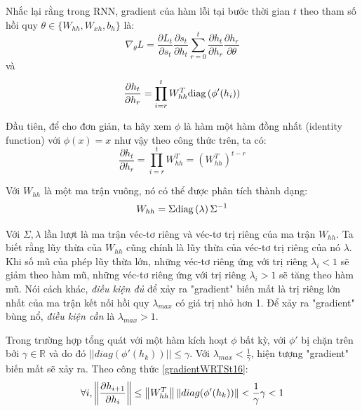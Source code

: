 Nhắc lại rằng trong RNN, gradient của hàm lỗi tại bước thời gian $t$ theo tham số hồi quy $\theta  \in \{W_{hh}, W_{xh}, b_h \}$ là:
\begin{equation} \label{beginGradientVanish0}
\nabla_{\theta}L = \frac{\partial L_t}{\partial s_t} \frac{\partial s_t}{\partial h_t} \sum_{r=0}^{t}  \frac{\partial h_t}{\partial h_r}\frac{\partial h_r}{\partial \theta}
\end{equation}
và 
\begin{equation} \label{beginGradientVanish1}
\frac{\partial h_t}{\partial h_r} = \prod_{i=r}^{t} W_{hh}^T \mathrm{diag} \left( \phi'(h_i) \right)
\end{equation}

Đầu tiên, để cho đơn giản, ta hãy xem $\phi$ là hàm một hàm đồng nhất (identity function) với $\phi(x) = x$ như vậy theo công thức trên, ta có:
\begin{equation} \label{gradientVanish3}
\frac{\partial h_t}{\partial h_r} = \prod_{i=r}^{t} W_{hh}^T = \left (W_{hh}^T \right)^{t-r}
\end{equation}

Với $W_{hh}$ là một ma trận vuông, nó có thể được phân tích thành dạng:
\begin{equation} \label{gradientVanish4}
W_{hh} = \Sigma \mathrm{diag} \left(\lambda \right) \Sigma^{-1} 
\end{equation}

Với $\Sigma, \lambda$ lần lượt là ma trận véc-tơ riêng và véc-tơ trị riêng của ma trận $W_{hh}$. Ta biết rằng lũy thừa của $W_{hh}$ cũng chính là lũy thừa của véc-tơ trị riêng của nó $\lambda$. Khi số mũ của phép lũy thừa lớn, những véc-tơ riêng ứng với trị riêng $\lambda_i < 1$ sẽ giảm theo hàm mũ, những véc-tơ riêng ứng với trị riêng $\lambda_i > 1$ sẽ tăng theo hàm mũ. Nói cách khác, \textit{điều kiện đủ} để xảy ra "gradient" biến mất là trị riêng lớn nhất của ma trận kết nối hồi quy $\lambda_{max}$ có giá trị nhỏ hơn 1. Để xảy ra "gradient" bùng nổ, \textit{điều kiện cần} là $\lambda_{max} > 1$.

Trong trường hợp tổng quát với một hàm kích hoạt $\phi$ bất kỳ, với $\phi'$ bị chặn trên bởi $\gamma \in \mathbb{R}$ và do đó $||diag(\phi'(h_k))|| \leq \gamma$. Với $\lambda_{max} < \frac{1}{\gamma}$, hiện tượng "gradient" biến mất sẽ xảy ra. Theo công thức \ref{gradientWRTSt16}:
\begin{equation} \label{gradientVanish5}
\forall i, \left\lVert\frac{\partial h_{i+1}}{\partial h_{i}}\right\rVert \leq \left\lVert W^T_{hh} \right\rVert \left\lVert diag(\phi'(h_k)) \right\rVert < \frac{1}{\gamma} \gamma < 1 
\end{equation}

